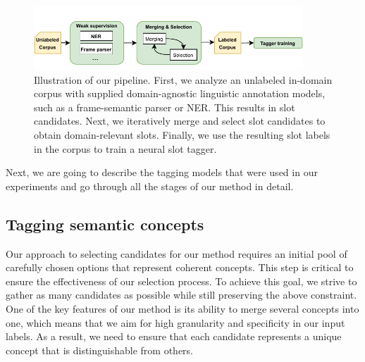 \begin{figure}[h]
    \centering
    \includegraphics[width=0.9\textwidth]{images/weakly-supervised.pdf}
    \caption{Illustration of our pipeline. First, we analyze an unlabeled in-domain corpus with supplied domain-agnostic linguistic annotation models, such as a frame-semantic parser or NER. This results in slot candidates. Next, we iteratively merge and select slot candidates to obtain domain-relevant slots. Finally, we use the resulting slot labels in the corpus to train a neural slot tagger.}
    \label{fig:discover_overall}
\end{figure}

Next, we are going to describe the tagging models that were used in our experiments and go through all the stages of our method in detail.

\subsection{Tagging semantic concepts}
\label{03:tagging_concepts}

Our approach to selecting candidates for our method requires an initial pool of carefully chosen options that represent coherent concepts. This step is critical to ensure the effectiveness of our selection process. To achieve this goal, we strive to gather as many candidates as possible while still preserving the above constraint.
One of the key features of our method is its ability to merge several concepts into one, which means that we aim for high granularity and specificity in our input labels. As a result, we need to ensure that each candidate represents a unique concept that is distinguishable from others.

